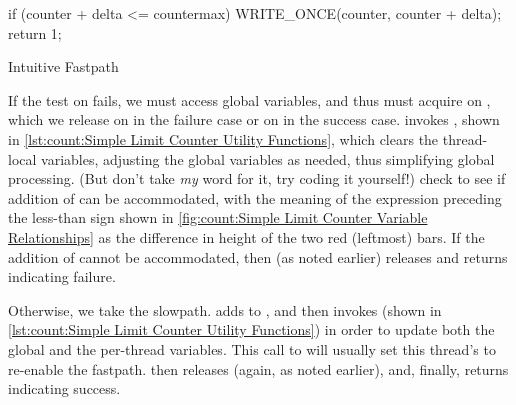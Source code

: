 \begin{listing}
\begin{VerbatimL}[firstnumber=3]
	if (counter + delta <= countermax) {
		WRITE_ONCE(counter, counter + delta);
		return 1;
	}
\end{VerbatimL}
\caption{Intuitive Fastpath}
\label{lst:count:Intuitive Fastpath}
\end{listing}

\QuickQuizEnd

\begin{fcvref}
If the test on
 fails, we must access global variables, and thus
must acquire  on
, which we release on 
in the failure case or on  in the success case.
 invokes , shown in
\cref{lst:count:Simple Limit Counter Utility Functions},
which clears the thread-local variables, adjusting the global variables
as needed, thus simplifying global processing.
(But don't take \emph{my} word for it, try coding it yourself!)
 check to see
if addition of  can be accommodated,
with the meaning of the expression preceding the less-than sign shown in
\cref{fig:count:Simple Limit Counter Variable Relationships}
as the difference in height of the two red (leftmost) bars.
If the addition of  cannot be accommodated, then
 (as noted earlier) releases  and
returns indicating failure.

Otherwise, we take the slowpath.
 adds  to , and then
 invokes  (shown in
\cref{lst:count:Simple Limit Counter Utility Functions})
in order to update both the global and the per-thread variables.
This call to 
will usually set this thread's  to re-enable the fastpath.
 then releases
 (again, as noted earlier), and, finally,
 returns indicating success.
\end{fcvref}

